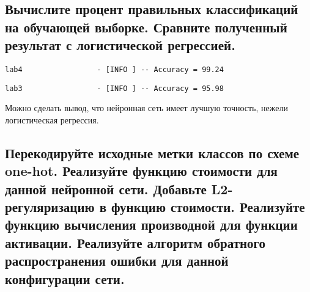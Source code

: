 \subsection{Вычислите процент правильных классификаций на обучающей выборке. Сравните полученный результат с логистической регрессией.}

\begin{lstlisting}
lab4                 - [INFO ] -- Accuracy = 99.24
\end{lstlisting}

\begin{lstlisting}
lab3                 - [INFO ] -- Accuracy = 95.98
\end{lstlisting}

Можно сделать вывод, что нейронная сеть имеет лучшую точность, нежели логистическая регрессия.

\subsection{Перекодируйте исходные метки классов по схеме one-hot. Реализуйте функцию стоимости для данной нейронной сети. Добавьте L2-регуляризацию в функцию стоимости. Реализуйте функцию вычисления производной для функции активации. Реализуйте алгоритм обратного распространения ошибки для данной конфигурации сети.}


